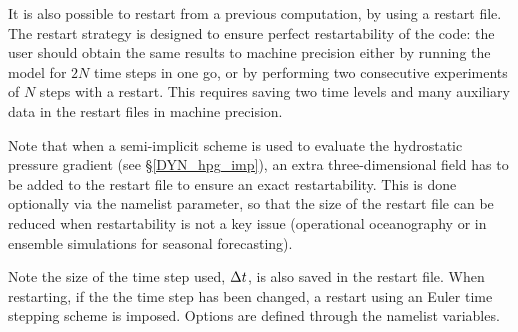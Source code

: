 It is also possible to restart from a previous computation, by using a 
restart file. The restart strategy is designed to ensure perfect 
restartability of the code: the user should obtain the same results to 
machine precision either by running the model for $2N$ time steps in one go, 
or by performing two consecutive experiments of $N$ steps with a restart. 
This requires saving two time levels and many auxiliary data in the restart 
files in machine precision. 

Note that when a semi-implicit scheme is used to evaluate the hydrostatic pressure 
gradient (see \S\ref{DYN_hpg_imp}), an extra three-dimensional field has to be 
added to the restart file to ensure an exact restartability. This is done optionally 
via the   namelist parameter, so that the size of the
restart file can be reduced when restartability is not a key issue (operational 
oceanography or in ensemble simulations for seasonal forecasting).

Note the size of the time step used, $\Delta t$, is also saved in the restart file. 
When restarting, if the the time step has been changed, a restart using an Euler time 
stepping scheme is imposed. 
Options are defined through the   namelist variables.




